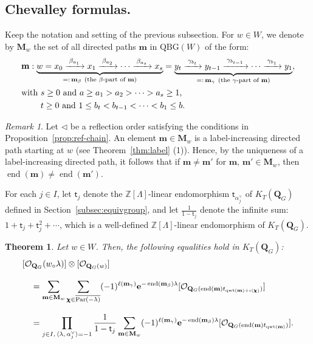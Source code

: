 \documentclass[11pt,a4paper,reqno,dvipdfmx]{amsart}
\numberwithin{equation}{section}
\newcommand{\BZ}{\mathbb{Z}}
\newcommand{\CO}{\mathcal{O}}
\newcommand{\st}{\mathsf{t}}
\newcommand{\be}{\mathbf{e}}
\newcommand{\bm}{\mathbf{m}}
\newcommand{\bM}{\mathbf{M}}
\DeclareMathOperator{\qwt}{qwt}
\DeclareMathOperator{\ed}{end}
\newcommand{\QBG}{\mathrm{QBG}}
\newcommand{\edge}[1]{ \xrightarrow{\hspace{2pt}#1\hspace{2pt}} }
\newcommand{\lng}{w_{\circ}}
\newcommand{\ol}[1]{\overline{#1}}
\newcommand{\pair}[2]{\langle #1,\,#2 \rangle}
\newcommand{\QG}{\mathbf{Q}_{G}}
\newcommand{\LQG}[1]{[\CO_{\QG}(#1)]}
\newcommand{\SQG}[1]{[\CO_{\QG(#1)}]}
\newcommand{\bchi}{\pmb{\chi}}
\newcommand{\Par}{\mathop{\rm Par}\nolimits}
\theoremstyle{plain}
\newtheorem{thm}[lem]{Theorem}
\theoremstyle{definition}
\theoremstyle{remark}
\newtheorem{rem}[lem]{Remark}
\begin{document}
%
\subsection{Chevalley formulas.}
\label{subsec:gc}

Keep the notation and setting of the previous subsection. 
For $w \in W$, we denote by $\bM_{w}$ the set of all directed paths $\bm$ in 
$\QBG(W)$ of the form:
%
%
\begin{equation} \label{eq:def-bMw}
%
\begin{split}
& \bm:\underbrace{w = x_{0} \edge{ \beta_{a_1} } x_{1} \edge{ \beta_{a_2} } \cdots 
  \edge{ \beta_{a_s} } x_{s}}_{=: \, \bm_{\beta} \ \text{(the $\beta$-part of $\bm$)}} = 
  \underbrace{y_{t} \edge{\gamma_{ b_t }} y_{t-1} \edge{ \gamma_{b_{t-1}} } \cdots 
  \edge{ \gamma_{b_1} } y_{1}}_{=: \, \bm_{\gamma}  \ \text{(the $\gamma$-part of $\bm$)}},  \\
& \text{\rm with $s \ge 0$ and $a \ge a_{1} > a_{2} > \cdots > a_{s} \ge 1$,} \\
& \text{\rm \phantom{with} $t \ge 0$ and $1 \le b_{t} < b_{t-1} < \cdots < b_{1} \le b$}. 
\end{split}
%
\end{equation}
%
%
\begin{rem} \label{rem:bMw}
Let $\lhd$ be a reflection order satisfying the conditions in Proposition~\ref{prop:ref-chain}. 
An element $\bm \in \bM_{w}$ is a label-increasing directed path starting at $w$ 
(see Theorem~\ref{thm:label} (1)). Hence, by the uniqueness of a label-increasing directed path, 
it follows that if $\bm \ne \bm'$ for $\bm,\,\bm' \in \bM_{w}$, then $\ed(\bm) \ne \ed(\bm')$. 
\end{rem}

For each $j \in I$, let $\st_{j}$ denote the $\BZ[\Lambda]$-linear 
endomorphism $\st_{\alpha_j^{\vee}}$ of $K_{T}(\QG)$ defined in Section~\ref{subsec:equivgroup}, 
and let $\frac{1}{1-\st_{j}}$ denote the infinite sum: 
$1 + \st_{j} + \st_{j}^2 + \cdots$, which is a well-defined $\BZ[\Lambda]$-linear 
endomorphism of $K_{T}(\QG)$. 
%
%
\begin{thm} \label{thm:gc}
Let $w \in W$. Then, the following equalities hold in $K_{T}(\QG)${\rm :} 
%
\begin{align}
& \LQG{\lng \lambda} \otimes \SQG{w} \nonumber \\[3mm]
& \quad = \sum_{\bm \in \bM_{w}}
  \sum_{ \bchi \in \ol{\Par(-\lambda)} }
  (-1)^{\ell(\bm_{\gamma})} \be^{ - \ed(\bm_{\beta}) \lambda }
  \SQG{ \ed(\bm)t_{\qwt(\bm)+\iota(\bchi)} } \nonumber \\[3mm]
& \quad = \prod_{ j \in I,\,
  \pair{\lambda}{\alpha_{j}^{\vee}} = -1 }
  \frac{1}{1-\st_{j}} \sum_{\bm \in \bM_{w}}
  (-1)^{\ell(\bm_{\gamma})} \be^{ - \ed(\bm_{\beta}) \lambda }
  \SQG{ \ed(\bm)t_{\qwt(\bm)} }. \label{eq:gchev}
\end{align}
%
\end{thm}
\end{document}
